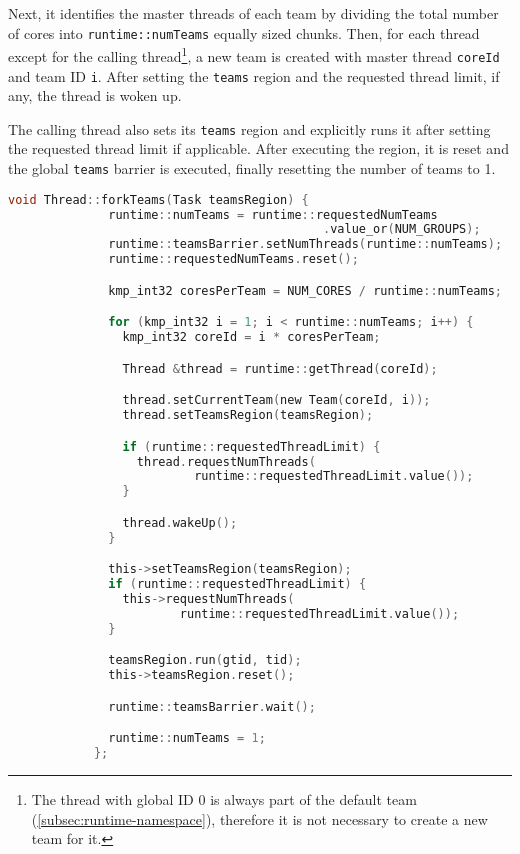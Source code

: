 \begin{itemize}
	      Next, it identifies the master threads of each team by dividing the total number of cores
	      into \texttt{runtime::numTeams} equally sized chunks. Then, for each thread except for the
	      calling thread\footnote{The thread with global ID 0 is always part of the default team
		      (\cref{subsec:runtime-namespace}), therefore it is not necessary to create a new team
		      for it.}, a new team is created with master thread \texttt{coreId} and team ID \texttt{i}.
	      After setting the \texttt{teams} region and the requested thread limit, if any, the thread
	      is woken up.

	      The calling thread also sets its \texttt{teams} region and explicitly runs it after
	      setting the requested thread limit if applicable. After executing the region, it is reset
	      and the global \texttt{teams} barrier is executed, finally resetting the number of teams
	      to 1.

	      \begin{lstlisting}[language=C, caption={void Thread::forkTeams},
          label={lst:thread-forkTeams},
          escapechar=@]
            void Thread::forkTeams(Task teamsRegion) {
              runtime::numTeams = runtime::requestedNumTeams
                                            .value_or(NUM_GROUPS);
              runtime::teamsBarrier.setNumThreads(runtime::numTeams);
              runtime::requestedNumTeams.reset();

              kmp_int32 coresPerTeam = NUM_CORES / runtime::numTeams;

              for (kmp_int32 i = 1; i < runtime::numTeams; i++) {
                kmp_int32 coreId = i * coresPerTeam;

                Thread &thread = runtime::getThread(coreId);

                thread.setCurrentTeam(new Team(coreId, i));
                thread.setTeamsRegion(teamsRegion);

                if (runtime::requestedThreadLimit) {
                  thread.requestNumThreads(
                          runtime::requestedThreadLimit.value());
                }

                thread.wakeUp();
              }

              this->setTeamsRegion(teamsRegion);
              if (runtime::requestedThreadLimit) {
                this->requestNumThreads(
                        runtime::requestedThreadLimit.value());
              }

              teamsRegion.run(gtid, tid);
              this->teamsRegion.reset();

              runtime::teamsBarrier.wait();

              runtime::numTeams = 1;
            };
    \end{lstlisting}

\end{itemize}


